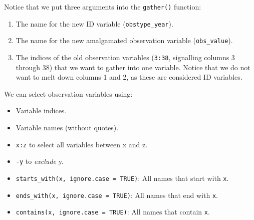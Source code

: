 \documentclass[]{book}
\newenvironment{Shaded}{\begin{snugshade}}{\end{snugshade}}
\newcommand{\KeywordTok}[1]{\textcolor[rgb]{0.13,0.29,0.53}{\textbf{#1}}}
\newcommand{\DecValTok}[1]{\textcolor[rgb]{0.00,0.00,0.81}{#1}}
\newcommand{\StringTok}[1]{\textcolor[rgb]{0.31,0.60,0.02}{#1}}
\newcommand{\CommentTok}[1]{\textcolor[rgb]{0.56,0.35,0.01}{\textit{#1}}}
\newcommand{\OperatorTok}[1]{\textcolor[rgb]{0.81,0.36,0.00}{\textbf{#1}}}
\newcommand{\NormalTok}[1]{#1}
\providecommand{\tightlist}{%
  \setlength{\itemsep}{0pt}\setlength{\parskip}{0pt}}
\begin{document}
\begin{Shaded}
\end{Shaded}

Notice that we put three arguments into the \texttt{gather()} function:

\begin{enumerate}
\def\labelenumi{\arabic{enumi}.}
\tightlist
\item
  The name for the new ID variable (\texttt{obstype\_year}).
\item
  The name for the new amalgamated observation variable
  (\texttt{obs\_value}).
\item
  The indices of the old observation variables (\texttt{3:38},
  signalling columns 3 through 38) that we want to gather into one
  variable. Notice that we do not want to melt down columns 1 and 2, as
  these are considered ID variables.
\end{enumerate}

We can select observation variables using:

\begin{itemize}
\tightlist
\item
  Variable indices.
\item
  Variable names (without quotes).
\item
  \texttt{x:z} to select all variables between x and z.
\item
  \texttt{-y} to \emph{exclude} y.
\item
  \texttt{starts\_with(x,\ ignore.case\ =\ TRUE)}: All names that start
  with \texttt{x}.
\item
  \texttt{ends\_with(x,\ ignore.case\ =\ TRUE)}: All names that end with
  \texttt{x}.
\item
  \texttt{contains(x,\ ignore.case\ =\ TRUE)}: All names that contain
  \texttt{x}.
\end{itemize}
\end{document}
